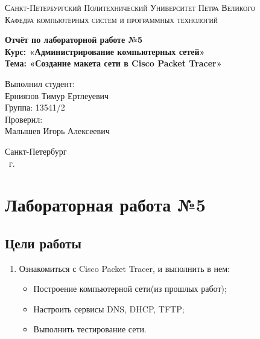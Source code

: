 \documentclass[14pt,a4paper,report]{report}
\begin{document}
\def\contentsname{Содержание}

\begin{titlepage}
	\begin{center}
		\textsc{Санкт-Петербургский Политехнический 
			Университет Петра Великого\\[5mm]
			Кафедра компьютерных систем и программных технологий}
		
		\vfill
		
		\textbf{Отчёт по лабораторной работе №5\\[3mm]
			Курс: «Администрирование компьютерных сетей»\\[3mm]
			Тема: «Создание макета сети в Cisco Packet Tracer»\\[35mm]
			}
	\end{center}
	
	\hfill
	\begin{minipage}{.5\textwidth}
		Выполнил студент:\\[2mm] 
		Ерниязов Тимур Ертлеуевич\\
		Группа: 13541/2\\[5mm]
		
		Проверил:\\[2mm] 
		Малышев Игорь Алексеевич
	\end{minipage}
	\vfill
	\begin{center}
		Санкт-Петербург\\ \the\year\ г.
	\end{center}
\end{titlepage}

\tableofcontents
\clearpage

\chapter{Лабораторная работа №5}
\section{Цели работы}
\begin{enumerate}
\item Ознакомиться с Cisco Packet Tracer, и выполнить в нем:
\begin{itemize}
\item Построение компьютерной сети(из прошлых работ);
\item Настроить сервисы DNS, DHCP, TFTP;
\item Выполнить тестирование сети.
\end{itemize}
\end{enumerate}
\end{document}
